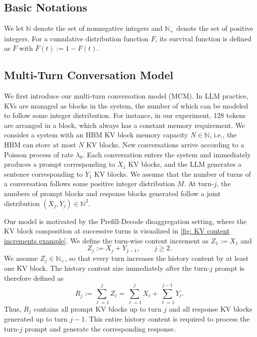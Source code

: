 \documentclass{article}
\theoremstyle{definition}
\newcommand{\N}{\mathbb N}
\begin{document}
\subsection{Basic Notations}
\label{ssec: Basic Notations}

We let $\mathbb N$ denote the set of nonnegative integers and $\mathbb N_+$ denote the set of positive integers. For a cumulative distribution function $F$, its survival function is defined as $\bar F$ with $\bar F(t):=1-F(t)$. 

\subsection{Multi-Turn Conversation Model}
\label{ssec: Generalized SCM}

We first introduce our multi-turn conversation model (MCM). In LLM practice, KVs are managed as blocks in the system, the number of which can be modeled to follow some integer distribution. For instance, in our experiment, 128 tokens are arranged in a block, which always has a constant memory requirement. We consider a system with an  HBM  KV block memory capacity $N\in\mathbb N$, i.e., the HBM can store at most $N$ KV blocks. New conversations arrive according to a Poisson process of rate $\lambda_0$. Each conversation enters the system and immediately produces a prompt corresponding to $X_1$ KV blocks, and the LLM generates a sentence corresponding to $Y_1$ KV blocks. We assume that the number of turns of a conversation follows some positive integer distribution $M$. At turn-$j$, the numbers of prompt blocks and response blocks generated follow a joint distribution $(X_j, Y_j) \in \N^2$. 


Our model is motivated by the Prefill-Decode disaggregation setting, where the KV block composition at successive turns is visualized in \cref{fig: KV content increments example}. We define the turn-wise content increment as $Z_1:=X_1$ and
\begin{equation*}
    Z_j:=X_j+Y_{j-1},\qquad j\geq2.
\end{equation*}
We assume $Z_j\in\N_+$, so that every turn increases the history content by at least one KV block. The history content size immediately after the turn-$j$ prompt is therefore defined as
\begin{equation}
    \label{equL The history content size R_j}
    R_j:=\sum_{\ell=1}^{j}Z_\ell=\sum_{\ell=1}^{j}X_\ell+\sum_{\ell=1}^{j-1}Y_\ell.
\end{equation}
Thus, $R_j$ contains all prompt KV blocks up to turn $j$ and all response KV blocks generated up to turn $j-1$. This entire history content is required to process the turn-$j$ prompt and generate the corresponding response.   
\end{document}
